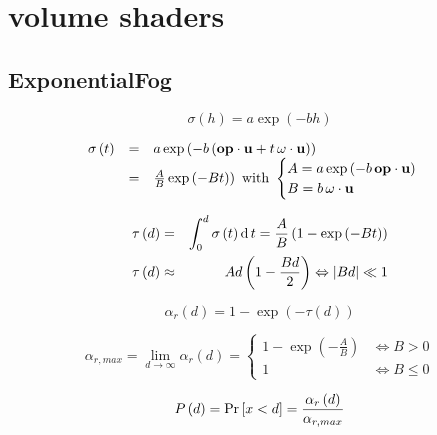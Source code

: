 \section{volume shaders}

\subsection{ExponentialFog}\label{shaders.ExponentialFog}

\begin{equation}
	\sigma \left( h \right) = a \exp \left( -bh \right)
\end{equation}

\begin{equation}
	\begin{array}{lcl}
		\sigma \left( t \right) &=& a \exp \left( -b \left( \mathbf{op} \cdot \mathbf{u} + t \, \mathbf{\omega} \cdot \mathbf{u} \right) \right)\\
		&=& \frac A B \exp \left( -B t ) \right)
			\text{ with } \begin{cases}
				A = a \exp \left( -b \, \mathbf{op} \cdot \mathbf{u} \right)\\
				B = b \, \mathbf{\omega} \cdot \mathbf{u}
			\end{cases}
	\end{array}
\end{equation}

\begin{eqnarray}
	\tau \left( d \right) &=& \int_0^d \sigma \left( t \right) \operatorname{d} t = \frac A B \left( 1 - \exp \left( -B t \right) \right)\\
	\tau \left( d \right) &\approx& A d \left(1 - \frac{B d} 2\right) \Leftrightarrow \left|{B d}\right| \ll 1
\end{eqnarray}

\begin{equation}
	\alpha_r \left( d \right) = 1 - \exp \left( -\tau \left( d \right) \right)
\end{equation}

\begin{equation}
	\alpha_{r,max} = \lim_{d \rightarrow \infty} \alpha_r \left( d \right) =
		\begin{cases}
			1 - \exp \left( -\frac A B \right) & \Leftrightarrow B > 0\\
			1 & \Leftrightarrow B \leq 0
		\end{cases}
\end{equation}

\begin{equation}
	P \left(d\right) = \Pr\left[x < d\right] = \frac {\alpha_r \left( d \right)} {\alpha_{r,max}}
\end{equation}


